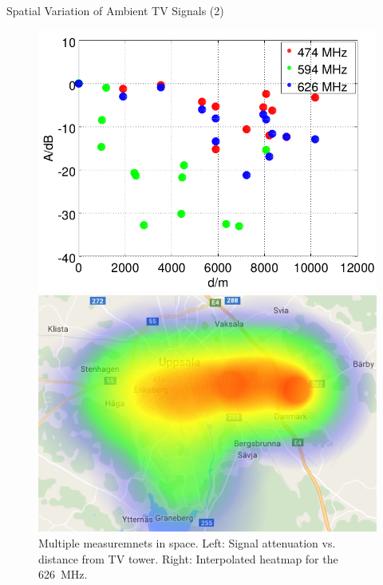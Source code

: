 \documentclass[apectratio=169]{beamer}
\begin{document}
\begin{frame}{Spatial Variation of Ambient TV Signals (2)}
\begin{figure}[h]
	\centering
	\begin{minipage}{0.49\columnwidth}
		\includegraphics[width=\columnwidth]{./fig/haversine}
	\end{minipage}
	\hfill
	\begin{minipage}{0.49\columnwidth}
		\includegraphics[width=\columnwidth]{./fig/heatmap_626mhz}
	\end{minipage}
	\caption{Multiple measuremnets in space. Left: Signal attenuation vs. distance from TV tower. Right: Interpolated heatmap for the \SI{626}{\mega\Hz}.}
	\label{fig:haversine}
\end{figure}
\end{frame}
\end{document}
